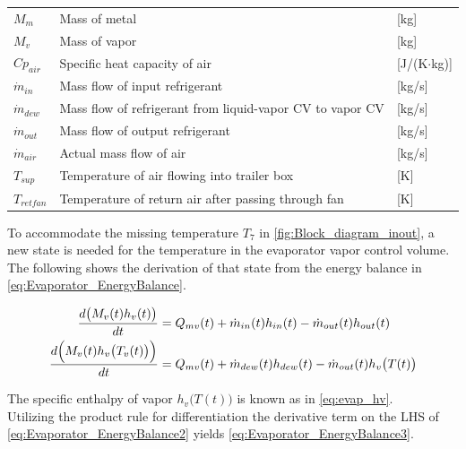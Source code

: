 \begin{center}
\begin{tabular}{l p{10cm} l}
		$M_{m}$          & Mass of metal                                                            & [\si{kg}]                         \\
		$M_{v}$          & Mass of vapor                                                            & [\si{kg}]                         \\
		$Cp_{air}$       & Specific heat capacity of air                                            & [\si{J}/(\si{K}$ \cdot $\si{kg})] \\
		$\dot{m}_{in} $  & Mass flow of input refrigerant                                           & [\si{kg}/\si{s}]                  \\
		$\dot{m}_{dew} $ & Mass flow of refrigerant from liquid-vapor CV to vapor CV                & [\si{kg}/\si{s}]                  \\
		$\dot{m}_{out} $ & Mass flow of output refrigerant                                          & [\si{kg}/\si{s}]                  \\
		$\dot{m}_{air}$  & Actual mass flow of air                                                  & [\si{kg}/\si{s}]                  \\
		$T_{sup} $       & Temperature of air flowing into trailer box                              & [\si{K}]                          \\
		$T_{retfan}$     & Temperature of return air after passing through fan                      & [\si{K}]
	\end{tabular}
\end{center}


To accommodate the missing temperature $ T_7 $ in \cref{fig:Block_diagram_inout}, a new state is needed for the temperature in the evaporator vapor control volume. The following shows the derivation of that state from the energy balance in \cref{eq:Evaporator_EnergyBalance}.

\begin{align}
	\frac{ d\bigl(M_{v}(t) h_v(t) \bigr)}{dt} & = Q_{mv}(t) + \dot{m}_{in}(t)h_{in}(t) - \dot{m}_{out}(t)h_{out}(t) 		\label{eq:Evaporator_EnergyBalance}\\
	\frac{ d\Bigl(M_{v}(t) h_v \bigl(T_v(t)\bigr) \Bigr)}{dt} & = Q_{mv}(t) + \dot{m}_{dew}(t)h_{dew}(t) - \dot{m}_{out}(t)h_v\bigl(T(t)\bigr)		\label{eq:Evaporator_EnergyBalance2}
\end{align}


The specific enthalpy of vapor $ h_v\bigl(T(t)\bigr) $ is known as in \cref{eq:evap_hv}. \\
Utilizing the product rule for differentiation the derivative term on the LHS of \cref{eq:Evaporator_EnergyBalance2} yields \cref{eq:Evaporator_EnergyBalance3}.


